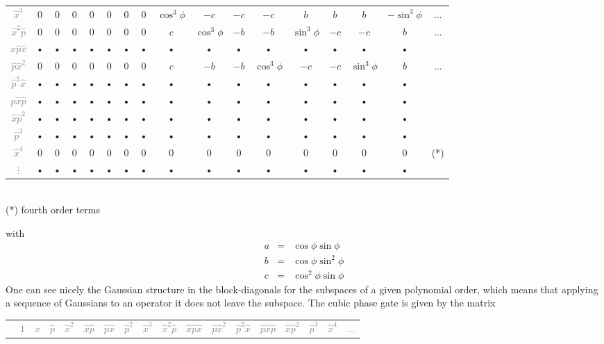 \documentclass[aps,pra,10pt,onecolumn,notitlepage, groupedaddress,nofootinbib]{revtex4-1}
\theoremstyle{plain}
\begin{document}
{\begin{center}
\begin{tabular}{ccccccccccccccccc}
\textcolor{gray}{$\hat{x}^3$} & 0 & 0 & 0 & 0 & 0 & 0 & 0 & $\cos^3 \phi$ & $- c$ & $- c$ & $ -c$ & $ b$ & $b$ & $b$ & $-\sin^3 \phi$ &  $\hdots$ \\ 
\textcolor{gray}{$\hat{x}^2\hat{p}$} & 0 & 0 & 0 & 0 & 0 & 0 & 0 & $c$ & $\cos^3 \phi$ & $-b$ & $-b$ & $\sin^3 \phi$ & $-c$  & $-c$ & $b$ &  $\hdots$ \\ 
\textcolor{gray}{$\hat{x}\hat{p}\hat{x}$} & • & • & • & • & • & • & • & • & • & • & • & • & •  & •& •  \\ 
\textcolor{gray}{$\hat{p}\hat{x}^2$} & 0 & 0 & 0 & 0 & 0 & 0 & 0 & $c$ & $-b$ & $-b$ & $\cos^3 \phi$ & $-c$ & $-c$  & $\sin^3 \phi$ & $b$ &  $\hdots$ \\ 
\textcolor{gray}{$\hat{p}^2\hat{x}$} & • & • & • & • & • & • & • & • & • & • & • & • & •  & •& •  \\ 
\textcolor{gray}{$\hat{p}\hat{x}\hat{p}$} & • & • & • & • & • & • & • & • & • & • & • & • & •  & • & • \\ 
\textcolor{gray}{$\hat{x}\hat{p}^2$} & • & • & • & • & • & • & • & • & • & • & • & • & •  & •& •  \\ 
\textcolor{gray}{$\hat{p}^3$} & • & • & • & • & • & • & • & • & • & • & • & • & •  & •& •  \\ 
\textcolor{gray}{$\hat{x}^4$} & 0 & 0 & 0 & 0 & 0 & 0 & 0 & 0 & 0 & 0 & 0 & 0 & 0& 0 & 0 & (*) \\ 
\textcolor{gray}{$\vdots$} & • & • & • & • & • & • & • & • & • & • & • & • & • & •& •  \\ 
\end{tabular}   \\
(*) fourth order terms
\end{center}
with
\begin{eqnarray*}
a &=& \cos \phi \sin \phi \\
b &=& \cos \phi \sin^2 \phi \\
c &=& \cos^2 \phi \sin \phi 
\end{eqnarray*}
One can see nicely the Gaussian structure in the block-diagonals for the subspaces of a given polynomial order, which means that applying a sequence of Gaussians to an operator it does not leave the subspace. 
The cubic phase gate is given by the matrix
\begin{center}
\def\arraystretch{1.5}
\footnotesize
\begin{tabular}{cccccccccccccccccc}
& \textcolor{gray}{$1$} & \textcolor{gray}{$\hat{x}$} & \textcolor{gray}{$\hat{p}$} & \textcolor{gray}{$\hat{x}^2$} & \textcolor{gray}{$\hat{x}\hat{p}$} & \textcolor{gray}{$\hat{p}\hat{x}$} & \textcolor{gray}{$\hat{p}^2$} & \textcolor{gray}{$\hat{x}^3$} & \textcolor{gray}{$\hat{x}^2\hat{p}$} & \textcolor{gray}{$\hat{x}\hat{p}\hat{x}$} & \textcolor{gray}{$\hat{p}\hat{x}^2$} &  \textcolor{gray}{$\hat{p}^2\hat{x}$} &  \textcolor{gray}{$\hat{p}\hat{x}\hat{p}$} &  \textcolor{gray}{$\hat{x}\hat{p}^2$} &  \textcolor{gray}{$\hat{p}^3$} & \textcolor{gray}{$\hat{x}^4$} & \textcolor{gray}{$\hdots$} \\  

\end{tabular}
\end{center}}
\end{document}
